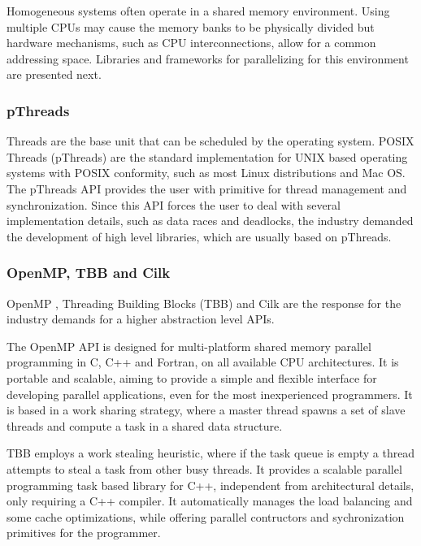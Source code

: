Homogeneous systems often operate in a shared memory environment. Using multiple CPUs may cause the memory banks to be physically divided but hardware mechanisms, such as CPU interconnections, allow for a common addressing space. Libraries and frameworks for parallelizing for this environment are presented next.

\subsubsection*{pThreads}
\label{pThreads}

Threads are the base unit that can be scheduled by the operating system. POSIX Threads (pThreads) are the standard implementation for UNIX based operating systems with POSIX conformity, such as most Linux distributions and Mac OS. The pThreads API provides the user with primitive for thread management and synchronization. Since this API forces the user to deal with several implementation details, such as data races and deadlocks, the industry demanded the development of high level libraries, which are usually based on pThreads.

\subsubsection*{OpenMP, TBB and Cilk}
\label{OpenMP}

OpenMP \cite{OpenMP}, \intel Threading Building Blocks (TBB) \cite{Intel:TBB} and Cilk \cite{Cilk} are the response for the industry demands for a higher abstraction level APIs.

The OpenMP API is designed for multi-platform shared memory parallel programming in C, C++ and Fortran, on all available CPU architectures. It is portable and scalable, aiming to provide a simple and flexible interface for developing parallel applications, even for the most inexperienced programmers. It is based in a work sharing strategy, where a master thread spawns a set of slave threads and compute a task in a shared data structure.

\intel TBB employs a work stealing heuristic, where if the task queue is empty a thread attempts to steal a task from other busy threads. It provides a scalable parallel programming task based library for C++, independent from architectural details, only requiring a C++ compiler. It automatically manages the load balancing and some cache optimizations, while offering parallel contructors and sychronization primitives for the programmer.

